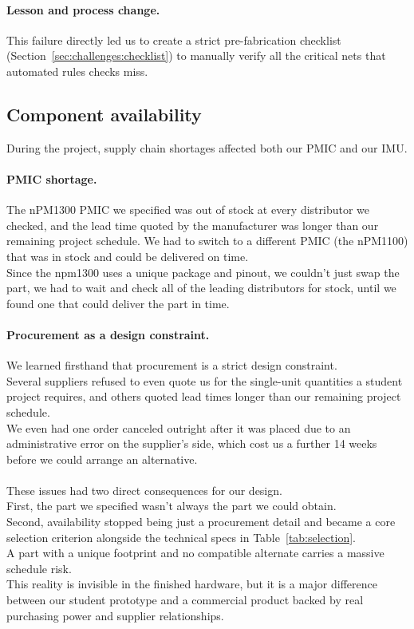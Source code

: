 \documentclass[12pt, a4paper]{article}
\begin{document}
\paragraph{Lesson and process change.} This failure directly led us to create a strict pre-fabrication checklist (Section~\ref{sec:challenges:checklist}) to manually verify all the critical nets that automated rules checks miss.

\subsection{Component availability}

During the project, supply chain shortages affected both our PMIC and our IMU.

\paragraph{PMIC shortage.} The nPM1300 PMIC we specified was out of stock at every distributor we checked, and the lead time quoted by the manufacturer was longer than our remaining project schedule. We had to switch to a different PMIC (the nPM1100) that was in stock and could be delivered on time.\\
Since the npm1300 uses a unique package and pinout, we couldn't just swap the part, we had to wait and check all of the leading distributors for stock, until we found one that could deliver the part in time.


\paragraph{Procurement as a design constraint.} We learned firsthand that procurement is a strict design constraint. \\
Several suppliers refused to even quote us for the single-unit quantities a student project requires, and others quoted lead times longer than our remaining project schedule. \\
We even had one order canceled outright after it was placed due to an administrative error on the supplier's side, which cost us a further 14 weeks before we could arrange an alternative.\\\\
These issues had two direct consequences for our design. \\
First, the part we specified wasn't always the part we could obtain. \\
Second, availability stopped being just a procurement detail and became a core selection criterion alongside the technical specs in Table~\ref{tab:selection}. \\
A part with a unique footprint and no compatible alternate carries a massive schedule risk. \\
This reality is invisible in the finished hardware, but it is a major difference between our student prototype and a commercial product backed by real purchasing power and supplier relationships.
\end{document}
